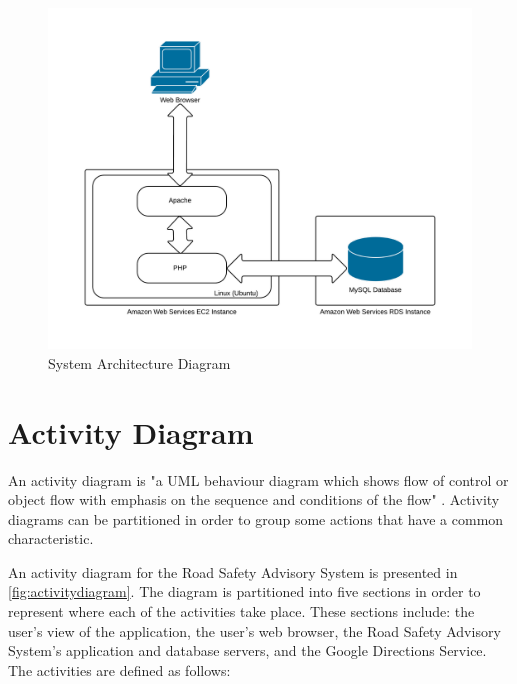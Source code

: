 \documentclass[authoryearcitations]{UoYCSproject}
\begin{document}
\begin{figure}
	\center
	\includegraphics[scale=0.7]{SystemArchitectureDiagram}
	\caption{System Architecture Diagram}
	\label{fig:sysarchitecture}
\end{figure}

\section{Activity Diagram}

An activity diagram is "a UML behaviour diagram which shows flow of control or object flow with emphasis on the sequence and conditions of the flow" \citep{uml-diagrams}. Activity diagrams can be partitioned in order to group some actions that have a common characteristic.

An activity diagram for the Road Safety Advisory System is presented in \autoref{fig:activitydiagram}. The diagram is partitioned into five sections in order to represent where each of the activities take place. These sections include: the user's view of the application, the user's web browser, the Road Safety Advisory System's application and database servers, and the Google Directions Service. The activities are defined as follows:
\end{document}
